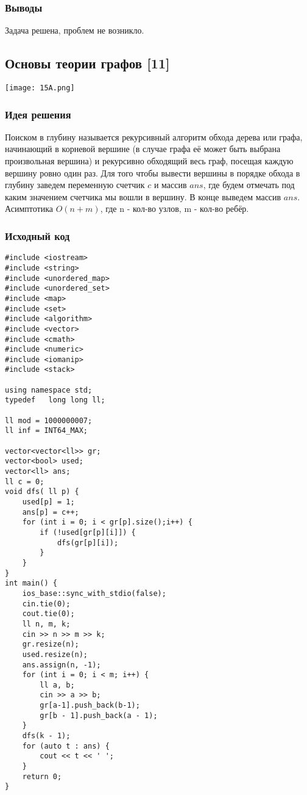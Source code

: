 \documentclass[12pt]{article}
\begin{document}
\subsubsection*{Выводы}
Задача решена, проблем не возникло. 
\subsection*{Основы теории графов [11]}
\begin{center}
\texttt{[image: 15A.png]}
\end{center}
\subsubsection*{Идея решения}
Поиском в глубину называется рекурсивный алгоритм обхода дерева или графа, начинающий в корневой вершине (в случае графа её может быть выбрана произвольная вершина) и рекурсивно обходящий весь граф, посещая каждую вершину ровно один раз. Для того чтобы вывести вершины в порядке обхода в глубину заведем переменную счетчик $c$ и массив $ans$, где будем отмечать под каким значением счетчика мы вошли в вершину. В конце выведем массив $ans$. Асимптотика $O(n+m)$, где n - кол-во узлов, m - кол-во ребёр. 
\subsubsection*{Исходный код}
\begin{lstlisting}
#include <iostream>
#include <string>
#include <unordered_map>
#include <unordered_set>
#include <map>
#include <set>
#include <algorithm>
#include <vector>
#include <cmath>
#include <numeric>
#include <iomanip>
#include <stack>

using namespace std;
typedef   long long ll;

ll mod = 1000000007;
ll inf = INT64_MAX;

vector<vector<ll>> gr;
vector<bool> used;
vector<ll> ans;
ll c = 0;
void dfs( ll p) {
    used[p] = 1;
    ans[p] = c++;
    for (int i = 0; i < gr[p].size();i++) {
        if (!used[gr[p][i]]) {
            dfs(gr[p][i]);
        }
    }
}
int main() {
    ios_base::sync_with_stdio(false);
    cin.tie(0);
    cout.tie(0);
    ll n, m, k;
    cin >> n >> m >> k;
    gr.resize(n);
    used.resize(n);
    ans.assign(n, -1);
    for (int i = 0; i < m; i++) {
        ll a, b;
        cin >> a >> b;
        gr[a-1].push_back(b-1);
        gr[b - 1].push_back(a - 1);
    }
    dfs(k - 1);
    for (auto t : ans) {
        cout << t << ' ';
    }
    return 0;
}
\end{lstlisting}
\end{document}
